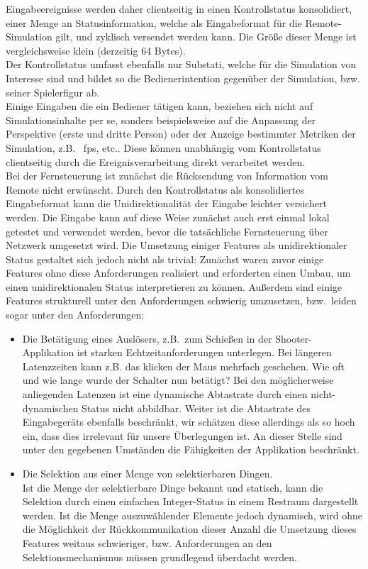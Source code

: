 Eingabeereignisse werden daher clientseitig in einen Kontrollstatus konsolidiert, einer Menge an Statusinformation, welche als Eingabeformat für die Remote-Simulation gilt, und zyklisch versendet werden kann. Die Größe dieser Menge ist vergleichsweise klein (derzeitig 64 Bytes).\\
Der Kontrollstatus umfasst ebenfalls nur Substati, welche für die Simulation von Interesse sind und bildet so die Bedienerintention gegenüber der Simulation, bzw. seiner Spielerfigur ab.\\
Einige Eingaben die ein Bediener tätigen kann, beziehen sich nicht auf Simulationsinhalte per se, sonders beispielsweise auf die Anpassung der Perspektive (erste und dritte Person) oder der Anzeige bestimmter Metriken der Simulation, z.B.~ fps, etc.. Diese können unabhängig vom Kontrollstatus clientseitig durch die Ereignisverarbeitung direkt verarbeitet werden.\\

Bei der Fernsteuerung ist zunächst die Rücksendung von Information vom Remote nicht erwünscht. Durch den Kontrollstatus als konsolidiertes Eingabeformat kann die Unidirektionalität der Eingabe leichter versichert werden. Die Eingabe kann auf diese Weise zunächst auch erst einmal lokal getestet und verwendet werden, bevor die tatsächliche Fernsteuerung über Netzwerk umgesetzt wird.
Die Umsetzung einiger Features als unidirektionaler Status gestaltet sich jedoch nicht als trivial:
Zunächst waren zuvor einige Features ohne diese Anforderungen realisiert und erforderten einen Umbau, um einen unidirektionalen Status interpretieren zu können.
Außerdem sind einige Features strukturell unter den Anforderungen schwierig umzusetzen, bzw.~leiden sogar unter den Anforderungen:
\begin{itemize}
\item Die Betätigung eines Auslösers, z.B.~zum Schießen in der Shooter-Applikation ist starken Echtzeitanforderungen unterlegen. Bei längeren Latenzzeiten kann z.B. das klicken der Maus mehrfach geschehen. Wie oft und wie lange wurde der Schalter nun betätigt? Bei den möglicherweise anliegenden Latenzen ist eine dynamische Abtastrate durch einen nicht-dynamischen Status nicht abbildbar. Weiter ist die Abtastrate des Eingabegeräts ebenfalls beschränkt, wir schätzen diese allerdings als so hoch ein, dass dies irrelevant für unsere Überlegungen ist. An dieser Stelle sind unter den gegebenen Umständen die Fähigkeiten der Applikation beschränkt.
\item Die Selektion aus einer Menge von selektierbaren Dingen.\\
Ist die Menge der selektierbare Dinge bekannt und statisch, kann die Selektion durch einen einfachen Integer-Status  in einem Restraum dargestellt werden. Ist die Menge auszuwählender Elemente jedoch dynamisch, wird ohne die Möglichkeit der Rückkommunikation dieser Anzahl die Umsetzung dieses Features weitaus schwieriger, bzw. Anforderungen an den Selektionsmechanismus müssen grundlegend überdacht werden.
\end{itemize}

